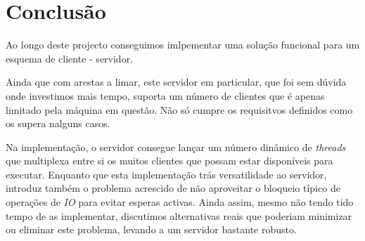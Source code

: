 \section{Conclusão\label{sec:Conclusao}}

	\indent\indent Ao longo deste projecto conseguimos imlpementar uma solução funcional para um esquema de cliente - servidor.
	
	Ainda que com arestas a limar, este servidor em particular, que foi sem dúvida onde investimos mais tempo, suporta um número de clientes que é apenas limitado pela máquina em questão.
	Não só cumpre os requisitvos definidos como os supera nalguns casos.
	
	Na implementação, o servidor consegue lançar um número dinâmico de \emph{threads} que multiplexa entre si os muitos clientes que possam estar disponíveis para executar.
	Enquanto que esta implementação trás versatilidade ao servidor, introduz também o problema acrescido de não aproveitar o bloqueio típico de operações de \emph{IO} para evitar esperas activas.
	Ainda assim, mesmo não tendo tido tempo de as implementar, discutimos alternativas reais que poderiam minimizar ou eliminar este problema, levando a um servidor bastante robusto.

\clearpage